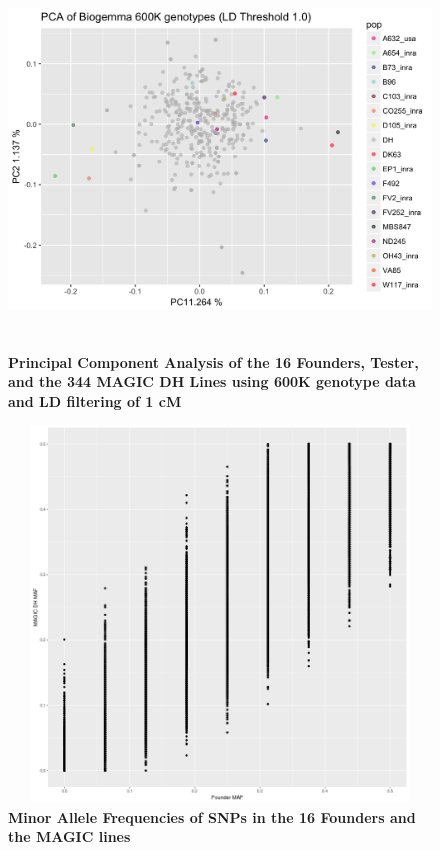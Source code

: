 \documentclass[article,9pt,twocolumn,twoside]{rilabRxiv}
\begin{document}
\begin{figure}[ht]
\centering
\includegraphics[width=16cm,height=10cm]{figures/PCA_LD1.png}
\caption{\textbf{Principal Component Analysis of the 16 Founders, Tester, and the 344 MAGIC DH Lines using 600K genotype data and LD filtering of 1 cM}}
\label{fig:supfigure7}
\end{figure}

\begin{figure}[ht]
\centering
\includegraphics[width=16cm,height=10cm]{figures/Biogemma_Founder_to_DH_MAF.png}
\caption{\textbf{Minor Allele Frequencies of SNPs in the 16 Founders and the MAGIC lines}}
\label{fig:supfigure8}
\end{figure}
\end{document}
